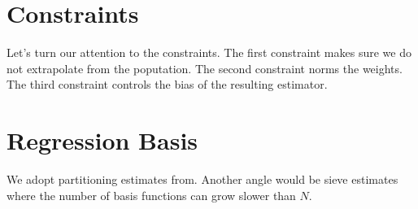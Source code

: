 \section*{Constraints}
Let's turn our attention to the constraints.
The first constraint makes sure we do not extrapolate from the poputation.
The second constraint norms the weights. 
The third constraint controls the bias of the resulting estimator.
\section*{Regression Basis}
We adopt partitioning estimates from\cite{Gyorfi2002}. Another angle would be sieve estimates\cite{Newey1997a} where the number of basis functions can grow slower than $N$.
%
